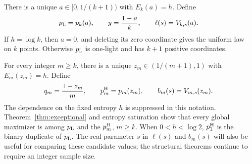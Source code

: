 \documentclass[11pt]{article}
\numberwithin{equation}{section}
\begin{document}
There is a unique $a\in[0,1/(k+1))$ with $E_k(a)=h$. Define
\begin{equation}\label{eq:light-candidate}
 p_{\rm L}=p_k(a),\qquad y=\frac{1-a}{k},\qquad
 \ell(s)=V_{k,s}(a).
\end{equation}
If $h=\log k$, then $a=0$, and deleting its zero coordinate gives the
uniform law on $k$ points. Otherwise $p_{\rm L}$ is one-light and has
$k+1$ positive coordinates.

For every integer $m\ge k$, there is a unique
$z_m\in(1/(m+1),1)$ with $E_m(z_m)=h$. Define
\begin{equation}\label{eq:heavy-candidates}
 q_m=\frac{1-z_m}{m},\qquad
 p_m^{\rm H}=p_m(z_m),\qquad b_m(s)=V_{m,s}(z_m).
\end{equation}
The dependence on the fixed entropy $h$ is suppressed in this notation.
Theorem~\ref{thm:exceptional} and entropy saturation show that every global
maximizer is among $p_{\rm L}$ and the $p_m^{\rm H}$, $m\ge k$.
When $0<h<\log2$, $p_1^{\rm H}$ is the binary duplicate of $p_{\rm L}$.
The real parameter $s$ in $\ell(s)$ and $b_m(s)$ will also be useful for
comparing these candidate values; the structural theorems continue to
require an integer sample size.
\end{document}
